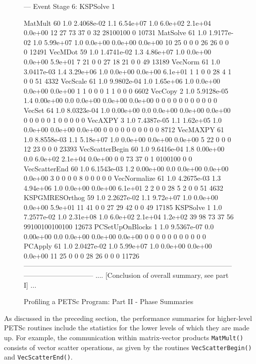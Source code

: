 \begin{figure}[tb]
\begin{outputlisting}[\tiny\ttfamily]
--- Event Stage 6: KSPSolve 1

MatMult               60 1.0 2.4068e-02 1.1 6.54e+07 1.0 6.0e+02 2.1e+04 0.0e+00 12 27 73 37  0  32 28100100  0 10731
MatSolve              61 1.0 1.9177e-02 1.0 5.99e+07 1.0 0.0e+00 0.0e+00 0.0e+00 10 25  0  0  0  26 26  0  0  0 12491
VecMDot               59 1.0 1.4741e-02 1.3 4.86e+07 1.0 0.0e+00 0.0e+00 5.9e+01  7 21  0  0 27  18 21  0  0 49 13189
VecNorm               61 1.0 3.0417e-03 1.4 3.29e+06 1.0 0.0e+00 0.0e+00 6.1e+01  1  1  0  0 28   4  1  0  0 51  4332
VecScale              61 1.0 9.9802e-04 1.0 1.65e+06 1.0 0.0e+00 0.0e+00 0.0e+00  1  1  0  0  0   1  1  0  0  0  6602
VecCopy                2 1.0 5.9128e-05 1.4 0.00e+00 0.0 0.0e+00 0.0e+00 0.0e+00  0  0  0  0  0   0  0  0  0  0     0
VecSet                64 1.0 8.0323e-04 1.0 0.00e+00 0.0 0.0e+00 0.0e+00 0.0e+00  0  0  0  0  0   1  0  0  0  0     0
VecAXPY                3 1.0 7.4387e-05 1.1 1.62e+05 1.0 0.0e+00 0.0e+00 0.0e+00  0  0  0  0  0   0  0  0  0  0  8712
VecMAXPY              61 1.0 8.8558e-03 1.1 5.18e+07 1.0 0.0e+00 0.0e+00 0.0e+00  5 22  0  0  0  12 23  0  0  0 23393
VecScatterBegin       60 1.0 9.6416e-04 1.8 0.00e+00 0.0 6.0e+02 2.1e+04 0.0e+00  0  0 73 37  0   1  0100100  0     0
VecScatterEnd         60 1.0 6.1543e-03 1.2 0.00e+00 0.0 0.0e+00 0.0e+00 0.0e+00  3  0  0  0  0   8  0  0  0  0     0
VecNormalize          61 1.0 4.2675e-03 1.3 4.94e+06 1.0 0.0e+00 0.0e+00 6.1e+01  2  2  0  0 28   5  2  0  0 51  4632
KSPGMRESOrthog        59 1.0 2.2627e-02 1.1 9.72e+07 1.0 0.0e+00 0.0e+00 5.9e+01 11 41  0  0 27  29 42  0  0 49 17185
KSPSolve               1 1.0 7.2577e-02 1.0 2.31e+08 1.0 6.0e+02 2.1e+04 1.2e+02 39 98 73 37 56  99100100100100 12673
PCSetUpOnBlocks        1 1.0 9.5367e-07 0.0 0.00e+00 0.0 0.0e+00 0.0e+00 0.0e+00  0  0  0  0  0   0  0  0  0  0     0
PCApply               61 1.0 2.0427e-02 1.0 5.99e+07 1.0 0.0e+00 0.0e+00 0.0e+00 11 25  0  0  0  28 26  0  0  0 11726
------------------------------------------------------------------------------------------------------------------------
.... [Conclusion of overall summary, see part I] ...
\end{outputlisting}
\caption{Profiling a PETSc Program: Part II - Phase Summaries}
\label{fig_exparprof2}
\end{figure}

As discussed in the preceding section, the performance summaries for
higher-level PETSc routines include the statistics for the lower
levels of which they are made up.  For example, the communication within
matrix-vector products \lstinline{MatMult()} consists of vector scatter
operations, as given by the routines \lstinline{VecScatterBegin()} and \lstinline{VecScatterEnd()}.
%
%

